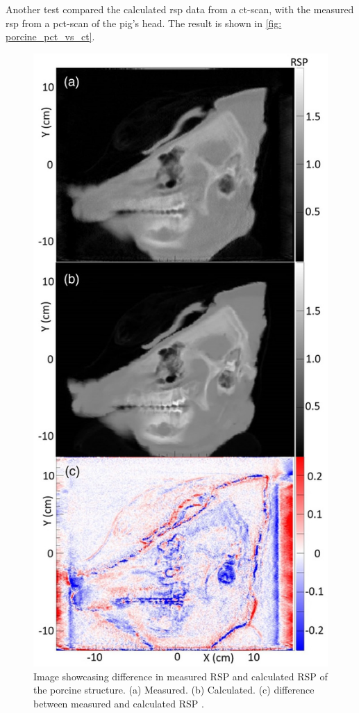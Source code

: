 \documentclass[main.tex]{subfiles}
\begin{document}
Another test compared the calculated \gls{rsp} data from a \gls{ct}-scan, with the measured \gls{rsp} from a \gls{pct}-scan of the pig's head. The result is shown in \autoref{fig: porcine_pct_vs_ct}.

\begin{figure}[!ht]
    \centering
    \includegraphics[scale=2.5]{images/porcine_comparison.jpg}
    \caption{Image showcasing difference in measured RSP and calculated RSP of the porcine structure. (a) Measured. (b) Calculated. (c) difference between measured and calculated RSP \cite{porcine_2021}.}
    \label{fig: porcine_pct_vs_ct}
\end{figure}
\FloatBarrier
\end{document}
